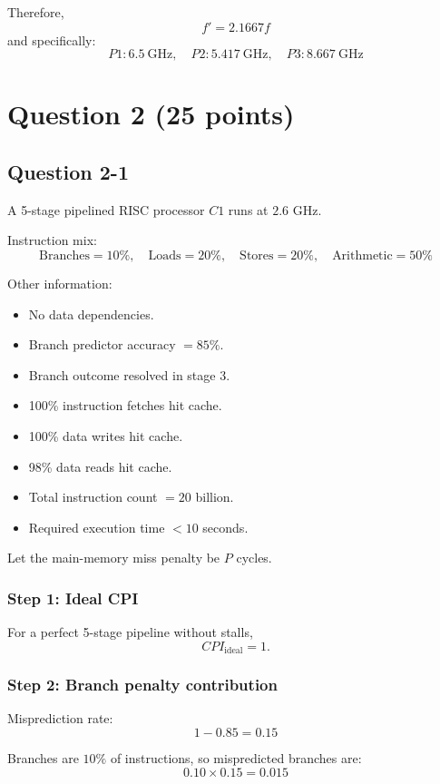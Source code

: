 \documentclass[12pt,a4paper]{article}
\begin{document}
Therefore,
\[
\boxed{f' = 2.1667f}
\]
and specifically:
\[
\boxed{
P1: 6.5~\text{GHz},\quad
P2: 5.417~\text{GHz},\quad
P3: 8.667~\text{GHz}
}
\]

\newpage
\section*{Question 2 (25 points)}

\subsection*{Question 2-1}

A 5-stage pipelined RISC processor \(C1\) runs at \(2.6\text{ GHz}\).

Instruction mix:
\[
\text{Branches}=10\%,\quad
\text{Loads}=20\%,\quad
\text{Stores}=20\%,\quad
\text{Arithmetic}=50\%
\]

Other information:
\begin{itemize}[leftmargin=2em]
    \item No data dependencies.
    \item Branch predictor accuracy \(=85\%\).
    \item Branch outcome resolved in stage 3.
    \item 100\% instruction fetches hit cache.
    \item 100\% data writes hit cache.
    \item 98\% data reads hit cache.
    \item Total instruction count \(=20\) billion.
    \item Required execution time \(<10\) seconds.
\end{itemize}

Let the main-memory miss penalty be \(P\) cycles.

\subsubsection*{Step 1: Ideal CPI}

For a perfect 5-stage pipeline without stalls,
\[
CPI_{\text{ideal}} = 1.
\]

\subsubsection*{Step 2: Branch penalty contribution}

Misprediction rate:
\[
1-0.85=0.15
\]

Branches are \(10\%\) of instructions, so mispredicted branches are:
\[
0.10\times 0.15=0.015
\]
\end{document}
